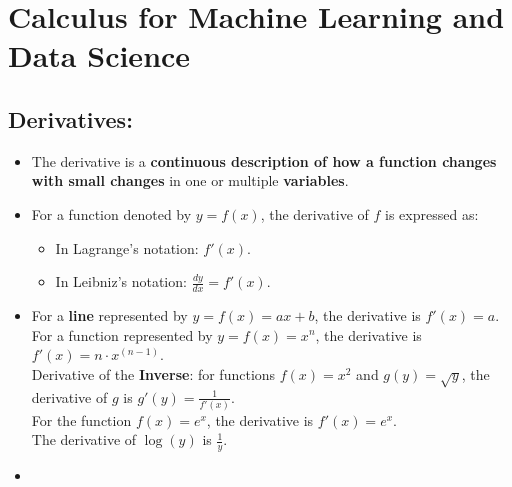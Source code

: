 \documentclass[16pt]{article}
\begin{document}
	\section{Calculus for Machine Learning and Data Science}
	\subsection{Derivatives:}
	\begin{itemize}
		\item The derivative is a \textbf{continuous description of how a function changes with small changes} in one or multiple \textbf{variables}.
		\item For a function denoted by $y = f(x)$, the derivative of $f$ is expressed as:
		\begin{itemize}
			\item In Lagrange's notation: $f'(x)$.
			\item In Leibniz's notation: $\frac{dy}{dx} = f'(x)$.
		\end{itemize}		
		\item For a \textbf{line} represented by $y = f(x) = ax + b$, the derivative is $f'(x) = a$.		
		\\
		For a function represented by $y = f(x) = x^n$, the derivative is $f'(x) = n \cdot x^{(n - 1)}$.		
		\\
		Derivative of the \textbf{Inverse}: for functions $f(x) = x^2$ and $g(y) = \sqrt{y}$, the derivative of $g$ is $g'(y) = \frac{1}{f'(x)}$.		
		\\
		For the function $f(x) = e^x$, the derivative is $f'(x) = e^x$.		
		\\
		The derivative of $\log(y)$ is $\frac{1}{y}$.
		\item 
	\end{itemize}
	
\end{document}
